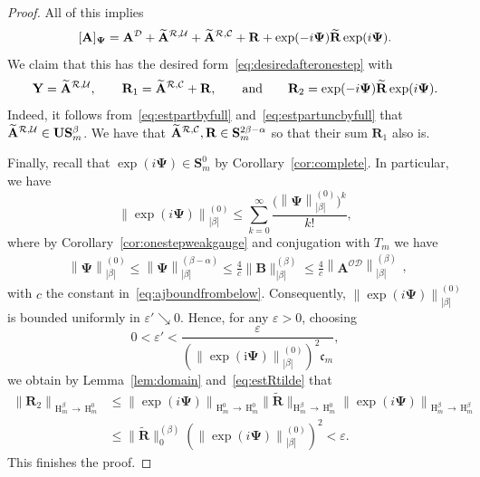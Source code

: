 \documentclass[10pt]{amsart}
\theoremstyle{definition}\newtheorem{defi}[theo]{Definition}\newtheorem{rema}[theo]{Remark}\newtheorem{exam}[theo]{Example}\newtheorem{nota}[theo]{Notation}
\newcommand{\RH}{\mathrm{H}}
\newcommand{\rmi}{\mathrm{i}}
\newcommand{\CC}{\mathcal{C}}
\newcommand{\CD}{\mathcal{D}}
\newcommand{\CO}{\mathcal{O}}
\newcommand{\CR}{\mathcal{R}}
\newcommand{\CU}{\mathcal{U}}
\newcommand{\COD}{{\CO\CD}}
\newcommand{\BPsi}{\boldsymbol \Psi}
\newcommand{\BA}{\mathbf A}
\newcommand{\BB}{\mathbf B}
\newcommand{\BS}{\mathbf S}
\newcommand{\BR}{\mathbf R}
\newcommand{\BU}{\mathbf U}
\newcommand{\BY}{\mathbf Y}
\newcommand{\Fc}{\mathfrak c}
\newcommand{\eps}{\varepsilon}
\renewcommand{\epsilon}{\varepsilon}
\newcommand{\norm}[1]{\left\| #1 \right\|}
\newcommand{\snorm}[3]{\left\| #1\right\|_{#3}^{(#2)}}
\let\oldtilde\tilde
\renewcommand*{\tilde}[1]{\mathchoice{\widetilde{#1}}{\widetilde{#1}}{\oldtilde{#1}}{\oldtilde{#1}}}
\begin{document}
\begin{proof}
All of this implies
\begin{equation}\label{eq:decompo}
[\BA]_{\BPsi} = \BA^\CD + \tilde \BA^{\CR,\CU} + \tilde \BA^{\CR,\CC} + \BR +
\exp(-i\BPsi) \tilde
\BR \exp(i \BPsi).
\end{equation}
We claim that this has the desired form~\eqref{eq:desiredafteronestep} with
\begin{equation}\label{eq:decompodetails}
\BY =
\tilde \BA^{\CR, \CU}, \qquad \BR_1 = \tilde \BA^{\CR,\CC} + \BR, \qquad
\text{and} \qquad \BR_2 =
\exp(-i \BPsi)
\tilde \BR \exp(i\BPsi).
\end{equation}
Indeed, it follows from~\eqref{eq:estpartbyfull} and~\eqref{eq:estpartuncbyfull} that $\tilde \BA^{\CR,\CU} \in \BU\BS^\beta_m$. We have that $\tilde \BA^{\CR,\CC}, \BR \in \BS_m^{2\beta - \alpha}$ so that their sum $\BR_1$ also is.

Finally, recall that $\exp(i\BPsi)\in\BS^0_m$ by Corollary~\ref{cor:complete}. In particular, we have
\begin{equation}
\snorm{\exp(i\BPsi)}{0}{|\beta|}\leq \sum\limits_{k=0}^\infty
\frac{\big(\snorm{\BPsi}{0}{|\beta|}\big)^k}{k!},
\end{equation}
where by Corollary~\ref{cor:onestepweakgauge} and conjugation with $T_m$ we have
\begin{equation}
\begin{aligned}
\snorm{\BPsi}{0}{|\beta|}\leq \snorm{\BPsi}{\beta-\alpha}{|\beta|}\le
\frac{4}{c}
\big\|\BB\big\|_{|\beta|}^{(\beta)} \leq \frac 4 c
\snorm{\BA^{\COD}}{\beta}{|\beta|}
\end{aligned},
\end{equation}
with $c$ the constant in~\eqref{eq:ajboundfrombelow}. Consequently, $\snorm{\exp(i\BPsi)}{0}{|\beta|}$ is bounded uniformly in $\epsilon'\searrow 0$. Hence, for any $\epsilon>0$, choosing
\begin{equation}
0< \eps' < \frac{\eps}{\left(\snorm{\exp(\rmi\BPsi)}{0}{|\beta|}\right)^2
\Fc_m},
\end{equation}
we obtain by Lemma~\ref{lem:domain} and~\eqref{eq:estRtilde} that
\begin{equation}\label{eq:normremainder}
\begin{aligned}
\norm{\BR_2}_{\RH_m^{\beta}\,\to\,\RH_m^0}&\leq \norm{\exp(i\BPsi)}_{\RH_m^0\,\to\,\RH_m^0}\big\|\widetilde{\BR}\big\|_{\RH_m^{\beta}\,\to\,\RH_m^0}\norm{\exp(i\BPsi)}_{\RH_m^{\beta}
\,\to\,\RH_m^{\beta}}\\
&\leq \big\|\widetilde{\BR}\big\|_{0}^{(\beta)}\left(\snorm{\exp(i\BPsi)}{0}{|\beta|}\right)^2<\epsilon.
\end{aligned}
\end{equation}
This finishes the proof.
\end{proof}
\end{document}
